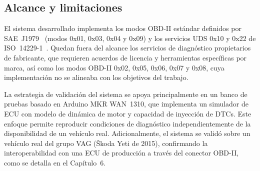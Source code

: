 \subsection{Alcance y limitaciones}
\label{sec:alcance}

El sistema desarrollado implementa los modos OBD-II estándar definidos por SAE~J1979~\cite{SAEJ1979:2014} (modos 0x01, 0x03, 0x04 y 0x09) y los servicios UDS 0x10 y 0x22 de ISO~14229-1~\cite{ISO14229-1:2020}. Quedan fuera del alcance los servicios de diagnóstico propietarios de fabricante, que requieren acuerdos de licencia y herramientas específicas por marca, así como los modos OBD-II 0x02, 0x05, 0x06, 0x07 y 0x08, cuya implementación no se alineaba con los objetivos del trabajo.

La estrategia de validación del sistema se apoya principalmente en un banco de pruebas basado en Arduino MKR WAN~1310, que implementa un simulador de ECU con modelo de dinámica de motor y capacidad de inyección de DTCs. Este enfoque permite reproducir condiciones de diagnóstico independientemente de la disponibilidad de un vehículo real. Adicionalmente, el sistema se validó sobre un vehículo real del grupo VAG (Škoda Yeti de 2015), confirmando la interoperabilidad con una ECU de producción a través del conector OBD-II, como se detalla en el Capítulo~6.
